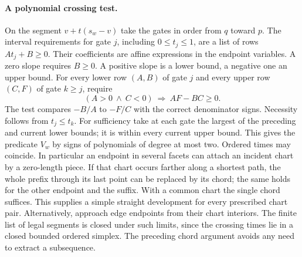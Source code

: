 \documentclass[10pt,letterpaper]{article}
\begin{document}
\paragraph{A polynomial crossing test.}
On the segment $v+t(s_w-v)$ take the gates in order from $q$ toward $p$. The interval requirements for gate $j$, including $0\le t_j\le1$, are a list of rows $A t_j+B\ge0$. Their coefficients are affine expressions in the endpoint variables. A zero slope requires $B\ge0$. A positive slope is a lower bound, a negative one an upper bound. For every lower row $(A,B)$ of gate $j$ and every upper row $(C,F)$ of gate $k\ge j$, require
\[
      (A>0\ \wedge\ C<0)\ \Longrightarrow\ AF-BC\ge0.
\]
The test compares $-B/A$ to $-F/C$ with the correct denominator signs. Necessity follows from $t_j\le t_k$. For sufficiency take at each gate the largest of the preceding and current lower bounds; it is within every current upper bound. This gives the predicate $V_w$ by signs of polynomials of degree at most two. Ordered times may coincide. In particular an endpoint in several facets can attach an incident chart by a zero-length piece. If that chart occurs farther along a shortest path, the whole prefix through its last point can be replaced by its chord; the same holds for the other endpoint and the suffix. With a common chart the single chord suffices. This supplies a simple straight development for every prescribed chart pair. Alternatively, approach edge endpoints from their chart interiors. The finite list of legal segments is closed under such limits, since the crossing times lie in a closed bounded ordered simplex. The preceding chord argument avoids any need to extract a subsequence.
\end{document}
